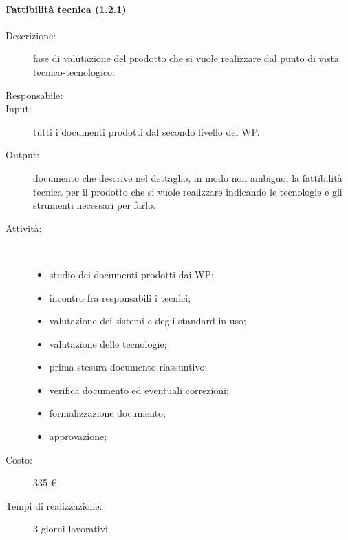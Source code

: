 \paragraph{Fattibilit\`{a} tecnica (1.2.1)}
\begin{description}
\item[Descrizione:] fase di valutazione del prodotto che si vuole realizzare dal punto di vista tecnico-tecnologico.
\item[Responsabile:] 
\item[Input:] tutti i documenti prodotti dal secondo livello del WP.
\item[Output:] documento che descrive nel dettaglio, in modo non ambiguo, la fattibilità tecnica per il prodotto che si vuole realizzare indicando le tecnologie e gli strumenti necessari per farlo.
\item[Attività:]\mbox{}\\[-1.5\baselineskip]
	\begin{itemize}
	\item studio dei documenti prodotti dai WP;
	\item incontro fra responsabili i tecnici;
	\item valutazione dei sistemi e degli standard in uso;
	\item valutazione delle tecnologie;
	\item prima stesura documento riassuntivo;
	\item verifica documento ed eventuali correzioni;
	\item formalizzazione documento;
	\item approvazione;
	\end{itemize}
\item[Costo:] 335 \euro{}
\item[Tempi di realizzazione:] 3 giorni lavorativi.
\end{description}

